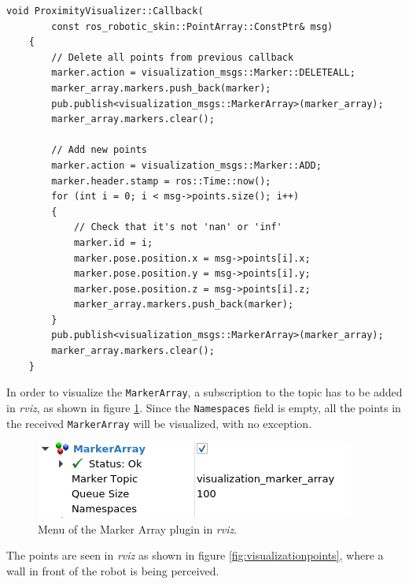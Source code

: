 \begin{lstlisting}[caption={Callback of the ProximityVisualizer class},captionpos=b,label={lst:visualizercallback}]
    void ProximityVisualizer::Callback(
        const ros_robotic_skin::PointArray::ConstPtr& msg)
    {
        // Delete all points from previous callback
        marker.action = visualization_msgs::Marker::DELETEALL;
        marker_array.markers.push_back(marker);
        pub.publish<visualization_msgs::MarkerArray>(marker_array);
        marker_array.markers.clear();

        // Add new points
        marker.action = visualization_msgs::Marker::ADD;
        marker.header.stamp = ros::Time::now();
        for (int i = 0; i < msg->points.size(); i++)
        {
            // Check that it's not 'nan' or 'inf'
            marker.id = i;
            marker.pose.position.x = msg->points[i].x;
            marker.pose.position.y = msg->points[i].y;
            marker.pose.position.z = msg->points[i].z;
            marker_array.markers.push_back(marker);
        }
        pub.publish<visualization_msgs::MarkerArray>(marker_array);
        marker_array.markers.clear();
    }
\end{lstlisting}

In order to visualize the \lstinline{MarkerArray}, a subscription to the topic has to be added in \textit{rviz}, as shown in figure \ref{fig:markerarrayrviz}. Since the \lstinline{Namespaces} field is empty, all the points in the received \lstinline{MarkerArray} will be visualized, with no exception.

\begin{figure}[H]
    \caption[Spheres]{
    Menu of the Marker Array plugin in \textit{rviz}.
    }
    \begin{center}
    \includegraphics[scale=0.75]{figs/markerarrayrviz.png}
    \end{center}
\label{fig:markerarrayrviz}
\end{figure}

The points are seen in \textit{rviz} as shown in figure \ref{fig:visualizationpoints}, where a wall in front of the robot is being perceived.

